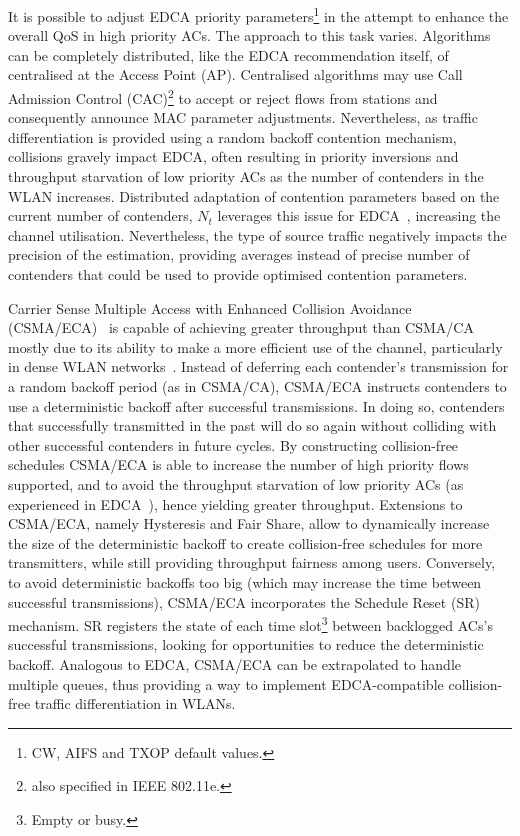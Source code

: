 \documentclass[a4paper]{article}
\begin{document}
It is possible to adjust EDCA priority parameters\footnote{CW, AIFS and TXOP default values.} in the attempt to enhance the overall QoS in high priority ACs. The approach to this task varies. Algorithms can be completely distributed, like the EDCA recommendation itself, of centralised at the Access Point (AP). Centralised algorithms may use Call Admission Control (CAC)\footnote{also specified in IEEE 802.11e.} to accept or reject flows from stations and consequently announce MAC parameter adjustments. Nevertheless, as traffic differentiation is provided using a random backoff contention mechanism, collisions gravely impact EDCA, often resulting in priority inversions and throughput starvation of low priority ACs as the number of contenders in the WLAN increases. Distributed adaptation of contention parameters based on the current number of contenders, $N_{t}$ leverages this issue for EDCA~\cite{1208922,lopez-toledo2006aoi}, increasing the channel utilisation. Nevertheless, the type of source traffic negatively impacts the precision of the estimation, providing averages instead of precise number of contenders that could be used to provide optimised contention parameters.

Carrier Sense Multiple Access with Enhanced Collision Avoidance (CSMA/ECA)~\cite{sanabria2014high,research2standards} is capable of achieving greater throughput than CSMA/CA mostly due to its ability to make a more efficient use of the channel, particularly in dense WLAN networks~\cite{sanabria2014high}. Instead of deferring each contender's transmission for a random backoff period (as in CSMA/CA), CSMA/ECA instructs contenders to use a deterministic backoff after successful transmissions. In doing so, contenders that successfully transmitted in the past will do so again without colliding with other successful contenders in future cycles. By constructing collision-free schedules CSMA/ECA is able to increase the number of high priority flows supported, and to avoid the throughput starvation of low priority ACs (as experienced in EDCA~\cite{990806}), hence yielding greater throughput. Extensions to CSMA/ECA, namely Hysteresis and Fair Share, allow to dynamically increase the size of the deterministic backoff to create collision-free schedules for more transmitters, while still providing throughput fairness among users. Conversely, to avoid deterministic backoffs too big (which may increase the time between successful transmissions), CSMA/ECA incorporates the Schedule Reset (SR) mechanism. SR registers the state of each time slot\footnote{Empty or busy.} between backlogged ACs's successful transmissions, looking for opportunities to reduce the deterministic backoff. Analogous to EDCA, CSMA/ECA can be extrapolated to handle multiple queues, thus providing a way to implement EDCA-compatible collision-free traffic differentiation in WLANs.
\end{document}
